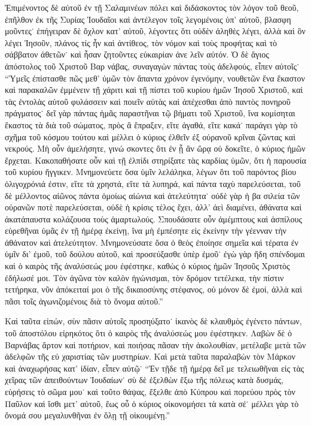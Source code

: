 Ἐπιμένοντος δὲ αὐτοῦ ἐν τῇ Σαλαμινέων πόλει καὶ
διδάσκοντος τὸν λόγον τοῦ θεοῦ, ἐπῆλθον ἐκ τῆς Συρίας
Ἰουδαῖοι καὶ ἀντέλεγον τοῖς λεγομένοις ὑπ’ αὐτοῦ, βλασφη%
μοῦντες˙ ἐπήγειραν δὲ ὄχλον κατ’ αὐτοῦ, λέγοντες ὅτι
οὐδὲν ἀληθὲς λέγει, ἀλλὰ καὶ ὃν λέγει Ἰησοῦν, πλάνος
τίς ἦν καὶ ἀντίθεος, τὸν νόμον καὶ τοὺς προφήτας καὶ
τὸ σάββατον ἀθετῶν˙ καὶ ἧσαν ζητοῦντες εὐκαιρίαν ἀνε%
λεῖν αὐτόν. Ὁ δὲ ἅγιος ἀπόστολος τοῦ Χριστοῦ Βαρ%
νάβας, συναγαγὼν πάντας τοὺς ἀδελφούς, εἶπεν αὐτοῖς˙
\enquote{Ὑμεῖς ἐπίστασθε πῶς μεθ’ ὑμῶν τὸν ἅπαντα χρόνον
ἐγενόμην, νουθετῶν ἕνα ἕκαστον καὶ παρακαλῶν ἐμμένειν
τῇ χάριτι καὶ τῇ πίστει τοῦ κυρίου ἡμῶν Ἰησοῦ Χριστοῦ,
καὶ τὰς ἐντολὰς αὐτοῦ φυλάσσειν καὶ ποιεῖν αὐτὰς καὶ
ἀπέχεσθαι ἀπὸ παντὸς πονηροῦ πράγματος˙ δεῖ γὰρ
πάντας ἡμᾶς παραστῆναι τῷ βήματι τοῦ Χριστοῦ, ἵνα
κομίσηται ἕκαστος τὰ διὰ τοῦ σώματος, πρὸς ἃ ἔπραξεν,
εἴτε ἀγαθά, εἴτε κακά˙ παράγει γὰρ τὸ σχῆμα τοῦ
κόσμου τούτου καὶ μέλλει ὁ κύριος ἐλθεῖν ἐξ οὐρανοῦ
κρῖναι ζῶντας καὶ νεκρούς. Μὴ οὖν ἀμελήσητε, γινώ%
σκοντες ὅτι ἐν ᾗ ἂν ὥρᾳ οὐ δοκεῖτε, ὁ κύριος ἡμῶν
ἔρχεται. Κακοπαθήσατε οὖν καὶ τῇ ἐλπίδι στηρίξατε τὰς
καρδίας ὑμῶν, ὅτι ἡ παρουσία τοῦ κυρίου ἤγγικεν.
Μνημονεύετε ὅσα ὑμῖν λελάληκα, λέγων ὅτι τοῦ παρόντος
βίου ὀλιγοχρόνιά ἐστιν, εἴτε τὰ χρηστά, εἴτε τὰ λυπηρά,
καὶ πάντα ταχὺ παρελεύσεται, τοῦ δὲ μέλλοντος αἰῶνος
πάντα ὁμοίως αἰώνια καὶ ἀτελεύτητα˙ οὐδὲ γὰρ ἡ βα%
σιλεία τῶν οὐρανῶν ποτὲ παρελεύσεται, οὐδὲ ἡ κρίσις
τέλος ἔχει, ἀλλ’ ἀεὶ διαμένει, ἀθάνατα καὶ ἀκατάπαυστα
κολάζουσα τοὺς ἁμαρτωλούς. Σπουδάσατε οὖν ἀμέμπτους
καὶ ἀσπίλους εὑρεθῆναι ὑμᾶς ἐν τῇ ἡμέρᾳ ἐκείνῃ, ἵνα
μὴ ἐμπέσητε εἰς ἐκείνην τὴν γέενναν τὴν ἀθάνατον καὶ
ἀτελεύτητον. Μνημονεύσατε ὅσα ὁ θεὸς ἐποίησε σημεῖα
καὶ τέρατα ἐν ὑμῖν δι’ ἐμοῦ, τοῦ δούλου αὐτοῦ, καὶ
προσεύξασθε ὑπὲρ ἐμοῦ˙ ἐγὼ γὰρ ἤδη σπένδομαι καὶ
ὁ καιρὸς τῆς ἀναλύσεώς μου ἐφέστηκε, καθὼς ὁ κύριος
ἡμῶν Ἰησοῦς Χριστὸς ἐδήλωσέ μοι. Τὸν ἀγῶνα τὸν
καλὸν ἠγώνισμαι, τὸν δρόμον τετέλεκα, τὴν πίστιν
τετήρηκα, νῦν ἀπόκειταί μοι ὁ τῆς δικαιοσύνης στέφανος,
οὐ μόνον δὲ ἐμοί, ἀλλὰ καὶ πᾶσι τοῖς ἀγωνιζομένοις
διὰ τὸ ὄνομα αὐτοῦ.}

Καὶ ταῦτα εἰπών, σὺν πᾶσιν αὐτοῖς προσηύξατο˙ ἱκανὸς
δὲ κλαυθμὸς ἐγένετο πάντων, τοῦ ἀποστόλου εἰρηκότος
ὅτι ὁ καιρὸς τῆς ἀναλύσεώς μου ἐφέστηκεν. Λαβὼν δὲ
ὁ Βαρνάβας ἄρτον καὶ ποτήριον, καὶ ποιήσας πᾶσαν
τὴν ἀκολουθίαν, μετέλαβε μετὰ τῶν ἀδελφῶν τῆς εὐ%
χαριστίας τῶν μυστηρίων. Καὶ μετὰ ταῦτα παραλαβὼν
τὸν Μάρκον καὶ ἀναχωρήσας κατ’ ἰδίαν, εἶπεν αὐτῷ˙ \enquote{Ἐν
τῇδε τῇ ἡμέρᾳ δεῖ με τελειωθῆναι εἰς τὰς χεῖρας τῶν
ἀπειθούντων Ἰουδαίων˙ σὺ δὲ ἐξελθὼν ἔξω τῆς πόλεως
κατὰ δυσμάς, εὑρήσεις τὸ σῶμα μου˙ καὶ τοῦτο θάψας,
ἔξελθε ἀπὸ Κύπρου καὶ πορεύου πρὸς τὸν Παῦλον καὶ
ἴσθι μετ’ αὐτοῦ, ἕως οὗ ὁ κύριος οἰκονομήσει τὰ κατὰ
σέ˙ μέλλει γὰρ τὸ ὄνομά σου μεγαλυνθῆναι ἐν ὅλῃ
τῇ οἰκουμένῃ.}

